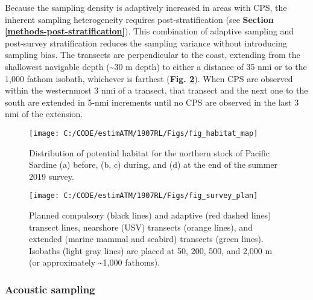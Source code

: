 \documentclass[]{article}
\begin{document}
Because the sampling density is adaptively increased in areas with CPS, the inherent sampling heterogeneity requires post-stratification (see \textbf{Section \ref{methods-post-stratification}}). This combination of adaptive sampling and post-survey stratification reduces the sampling variance without introducing sampling bias. The transects are perpendicular to the coast, extending from the shallowest navigable depth (\textasciitilde30 m depth) to either a distance of 35 nmi or to the 1,000 fathom isobath, whichever is farthest (\textbf{Fig. \ref{fig:survey-plan}}). When CPS are observed within the westernmost 3 nmi of a transect, that transect and the next one to the south are extended in 5-nmi increments until no CPS are observed in the last 3 nmi of the extension.

\newpage



\begin{figure}[H]

{\centering \texttt{[image: C:/CODE/estimATM/1907RL/Figs/fig\_habitat\_map]} 

}

\caption{Distribution of potential habitat for the northern stock of Pacific Sardine (a) before, (b, c) during, and (d) at the end of the summer 2019 survey.}\label{fig:sardine-potential-habitat}
\end{figure}

\newpage



\begin{figure}[H]

{\centering \texttt{[image: C:/CODE/estimATM/1907RL/Figs/fig\_survey\_plan]} 

}

\caption{Planned compulsory (black lines) and adaptive (red dashed lines) transect lines, nearshore (USV) transects (orange lines), and extended (marine mammal and seabird) transects (green lines). Isobaths (light gray lines) are placed at 50, 200, 500, and 2,000 m (or approximately \textasciitilde1,000 fathoms).}\label{fig:survey-plan}
\end{figure}

\newpage

\hypertarget{methods-acoustic-sampling}{%
\subsubsection{Acoustic sampling}\label{methods-acoustic-sampling}}
\end{document}
